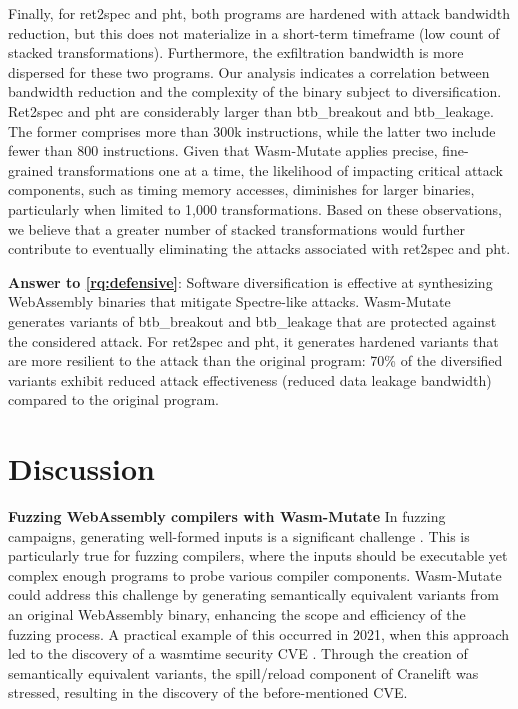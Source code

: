 \documentclass[a4paper,fleqn]{cas-dc}
\newcommand{\tool}{{\sc Wasm-Mutate}\xspace}
\newcommand{\Wasm}{WebAssembly\xspace}
\newcommand{\wasm}{\Wasm}
\begin{document}
Finally, for ret2spec and pht, both programs are hardened with attack bandwidth reduction, but this does not materialize in a short-term timeframe (low count of stacked transformations).
Furthermore,  the exfiltration bandwidth is more dispersed for these two programs.
Our analysis indicates a correlation between bandwidth reduction and the complexity of the binary subject to diversification.
Ret2spec and pht are considerably larger than btb\_breakout and btb\_leakage.
The former comprises more than 300k instructions, while the latter two include fewer than 800 instructions.
Given that \tool applies precise, fine-grained transformations one at a time, the likelihood of impacting critical attack components, such as timing memory accesses, diminishes for larger binaries, particularly when limited to 1,000 transformations.
Based on these observations, we believe that a greater number of stacked transformations would further contribute to eventually eliminating the attacks associated with ret2spec and pht.


\begin{tcolorbox}[boxrule=1pt,arc=.3em,boxsep=-1.3mm]
  \textbf{Answer to \ref{rq:defensive}}:   Software diversification is effective at synthesizing \wasm binaries that mitigate Spectre-like attacks.  
  \tool generates variants of btb\_breakout and btb\_leakage that are protected against the considered attack. For ret2spec and pht, it generates hardened variants that are more resilient to the attack than the original program: 70\% of the diversified variants exhibit reduced attack effectiveness (reduced data leakage bandwidth) compared to the original program.
\end{tcolorbox}


\section{Discussion}
\label{discussion}


\textbf{Fuzzing \Wasm compilers with \tool}
In fuzzing campaigns, generating well-formed inputs is a significant challenge \cite{7958599}. 
This is particularly true for fuzzing compilers, where the inputs should be executable yet complex enough programs to probe various compiler components. 
\tool could address this challenge by generating semantically equivalent variants from an original \wasm binary, enhancing the scope and efficiency of the fuzzing process. 
A practical example of this occurred in 2021, when this approach led to the discovery of a wasmtime security CVE \cite{CVE}. 
Through the creation of semantically equivalent variants, the spill/reload component of Cranelift was stressed, resulting in the discovery of the before-mentioned CVE.
\end{document}
